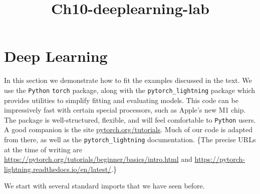\documentclass[11pt]{article}
\title{Ch10-deeplearning-lab}
\begin{document}
    
    \maketitle
    
    

    
    \hypertarget{deep-learning}{%
\section{Deep Learning}\label{deep-learning}}

\href{https://mybinder.org/v2/gh/intro-stat-learning/ISLP_labs/v2.2?labpath=Ch10-deeplearning-lab.ipynb}{}

    In this section we demonstrate how to fit the examples discussed in the
text. We use the \texttt{Python} \texttt{torch} package, along with the
\texttt{pytorch\_lightning} package which provides utilities to simplify
fitting and evaluating models. This code can be impressively fast with
certain special processors, such as Apple's new M1 chip. The package is
well-structured, flexible, and will feel comfortable to \texttt{Python}
users. A good companion is the site
\href{https://pytorch.org/tutorials/beginner/basics/intro.html}{pytorch.org/tutorials}.
Much of our code is adapted from there, as well as the
\texttt{pytorch\_lightning} documentation. \{The precise URLs at the
time of writing are
\url{https://pytorch.org/tutorials/beginner/basics/intro.html} and
\url{https://pytorch-lightning.readthedocs.io/en/latest/}.\}

We start with several standard imports that we have seen before.
\end{document}
